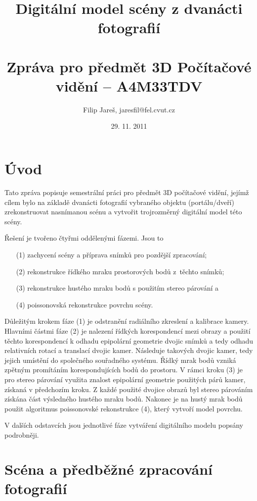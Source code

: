 \documentclass[11pt,oneside,a4paper,pdftex]{article}   %
\title{Digitální model scény z dvanácti fotografií \\ \ \\ \large Zpráva pro předmět 3D Počítačové vidění -- A4M33TDV}
\date{29. 11. 2011}
\author{Filip Jareš, jaresfil@fel.cvut.cz}
\begin{document}
\maketitle

\section*{Úvod}

	Tato zpráva popisuje semestrální práci pro předmět 3D počítačové vidění, jejímž cílem bylo na základě
	dvanácti fotografií vybraného objektu (portálu/dveří) zrekonstruovat nasnímanou scénu a vytvořit
	trojrozměrný digitální model této scény.
	
	Řešení je tvořeno čtyřmi oddělenými fázemi. Jsou to
	\begin{enumerate}
		\item[(1)]	zachycení scény a příprava snímků pro pozdější zpracování;
		\item[(2)]	rekonstrukce řídkého mraku prostorových bodů z~těchto snímků;
		\item[(3)]	rekonstrukce hustého mraku bodů s použitím stereo párování a
		\item[(4)]	poissonovská rekonstrukce povrchu scény.
	\end{enumerate}
	
	Důležitým krokem fáze (1) je odstranění radiálního zkreslení a kalibrace kamery. Hlavními částmi fáze
	(2) je nalezení řídkých korespondencí mezi obrazy a použití těchto korespondencí k odhadu epipolární
	geometrie dvojic snímků a tedy odhadu relativních rotací a translací dvojic kamer.  Následuje
	 takových dvojic kamer, tedy jejich umístění do společného souřadného systému. Řídký
	mrak bodů vzniká zpětným promítáním korespondujících bodů do prostoru. V rámci kroku (3) je pro
	stereo párování využita znalost epipolární geometrie použitých párů kamer, získaná v předchozím
	kroku.  Z každé použité dvojice obrazů byl stereo párováním získána část výsledného hustého mraku
	bodů.  Nakonec je na hustý mrak bodů použit algoritmus poissonovské rekonstrukce (4), který vytvoří
	model povrchu.
	
	V dalších odstavcích jsou jednotlivé fáze vytváření digitálního modelu popsány podrobněji.

\section{Scéna a předběžné zpracování fotografií}
\end{document}
